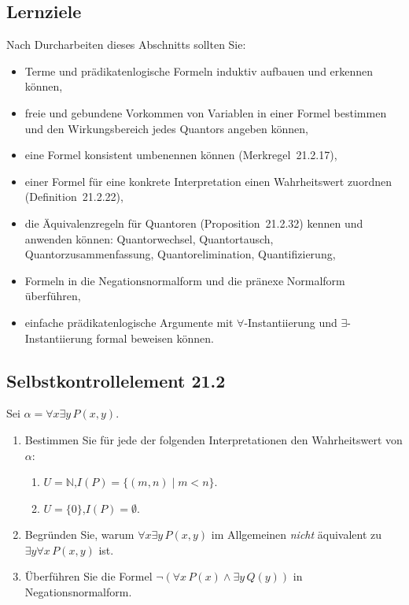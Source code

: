 \documentclass[a4paper,12pt]{article}
\begin{document}
\subsection*{Lernziele}

Nach Durcharbeiten dieses Abschnitts sollten Sie:
\begin{itemize}
  \item Terme und prädikatenlogische Formeln induktiv aufbauen und erkennen können,
  \item freie und gebundene Vorkommen von Variablen in einer Formel bestimmen
        und den Wirkungsbereich jedes Quantors angeben können,
  \item eine Formel konsistent umbenennen können (Merkregel~21.2.17),
  \item einer Formel für eine konkrete Interpretation einen Wahrheitswert zuordnen
        (Definition~21.2.22),
  \item die Äquivalenzregeln für Quantoren (Proposition~21.2.32) kennen und
        anwenden können: Quantorwechsel, Quantortausch, Quantorzusammenfassung,
        Quantorelimination, Quantifizierung,
  \item Formeln in die Negationsnormalform und die pränexe Normalform überführen,
  \item einfache prädikatenlogische Argumente mit $\forall$-Instantiierung und
        $\exists$-Instantiierung formal beweisen können.
\end{itemize}

\subsection*{Selbstkontrollelement 21.2}

Sei $\alpha = \forall x \exists y\, P(x, y)$.
\begin{enumerate}[label=(\alph*)]
  \item Bestimmen Sie für jede der folgenden Interpretationen den Wahrheitswert
        von $\alpha$:
        \begin{enumerate}[label=(\roman*)]
          \item $U = \mathbb{N}$,\quad $I(P) = \{(m,n) \mid m < n\}$.
          \item $U = \{0\}$,\quad $I(P) = \emptyset$.
        \end{enumerate}
  \item Begründen Sie, warum $\forall x \exists y\, P(x,y)$ im Allgemeinen
        \emph{nicht} äquivalent zu $\exists y \forall x\, P(x,y)$ ist.
  \item Überführen Sie die Formel $\neg(\forall x\, P(x) \land \exists y\, Q(y))$
        in Negationsnormalform.
\end{enumerate}
\end{document}
